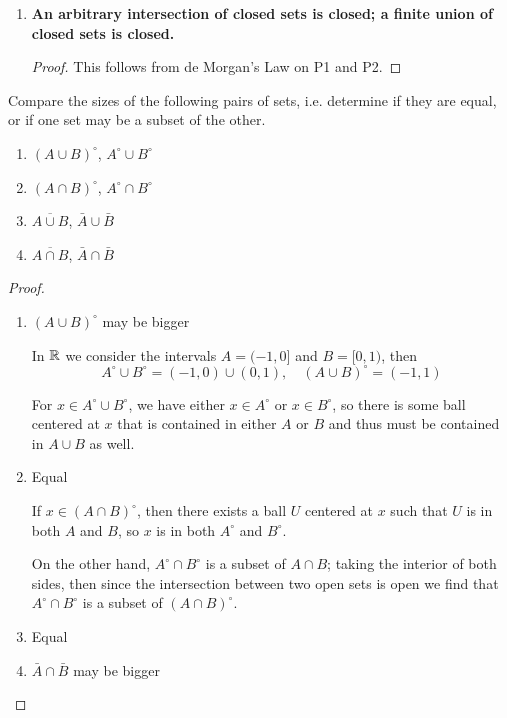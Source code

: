 \begin{enumerate}[label=\textbf{P\arabic*}]
\begin{proof}
Then for any $x \in A$, suppose that $x \in U_i$, then since $U_i$ is open we can pick $B(x,\epsilon)$ subset of $U_i$ subset of $A$

On the other hand, let $U$ and $V$ be open sets and let $x \in U \cap V$. 
Since $U$ and $V$ are open, we can pick $\epsilon_1$ and $\epsilon_2$ such that $B(x,\epsilon_1)$ is in $U$ whereas $B(x,\epsilon_2)$ is in $V$. 
Then we simply pick $\epsilon=\min\{\epsilon_1,\epsilon_2\}$ so that $B(x,\epsilon)$ is in $U \cap V$.
\end{proof}

\item \textbf{An arbitrary intersection of closed sets is closed; a finite union of closed sets is closed.}

\begin{proof}
This follows from de Morgan's Law on P1 and P2.
\end{proof}
\end{enumerate}

\begin{prbm}
Compare the sizes of the following pairs of sets, i.e. determine if they are equal, or if one set may be a subset of the other.
\begin{enumerate}
\item $(A\cup B)^\circ$, $A^\circ\cup B^\circ$
\item $(A\cap B)^\circ$, $A^\circ\cap B^\circ$
\item $\overline{A\cup B}$, $\bar{A}\cup\bar{B}$
\item $\overline{A\cap B}$, $\bar{A}\cap\bar{B}$
\end{enumerate}
\end{prbm}

\begin{proof} \
\begin{enumerate}
\item $(A\cup B)^\circ$ may be bigger

In $\mathbb R$ we consider the intervals $A=(-1,0]$ and $B=[0,1)$, then
\[ A^\circ\cup B^\circ=(-1,0)\cup(0,1), \quad (A\cup B)^\circ=(-1,1) \]

For $x \in A^\circ \cup B^\circ$, we have either $x \in A^\circ$ or $x \in B^\circ$, so there is some ball centered at $x$ that is contained in either $A$ or $B$ and thus must be contained in $A\cup B$ as well.

\item Equal

If $x \in (A\cap B)^\circ$, then there exists a ball $U$ centered at $x$ such that $U$ is in both $A$ and $B$, so $x$ is in both $A^\circ$ and $B^\circ$.

On the other hand, $A^\circ\cap B^\circ$ is a subset of $A\cap B$; taking the interior of both sides, then since the intersection between two open sets is open we find that $A^\circ\cap B^\circ$ is a subset of $(A\cap B)^\circ$.

\item Equal

\item $\bar{A}\cap\bar{B}$ may be bigger
\end{enumerate}
\end{proof}

